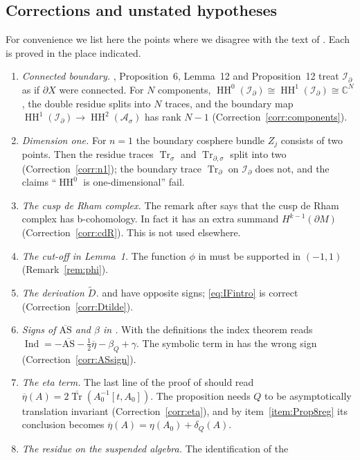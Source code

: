 \documentclass[11pt,oneside,reqno]{article}
\DeclareMathOperator{\HH}{HH}
\DeclareMathOperator{\Tr}{Tr}
\DeclareMathOperator{\Ind}{Ind}
\newcommand{\C}{\mathbb C}
\newcommand{\Id}{\mathcal I_\partial}
\newcommand{\As}{\mathcal A_\sigma}
\newcommand{\bTr}{\overline{\Tr}}
\newcommand{\bAS}{\overline{\mathrm{AS}}}
\newcommand{\etab}{\overline\eta}
\theoremstyle{plain}
\theoremstyle{definition}
\theoremstyle{remark}
\begin{document}
\subsection{Corrections and unstated hypotheses}\label{subsec:errata}
For convenience we list here the points where we disagree with the text of
\cite{MN}. Each is proved in the place indicated.
\begin{enumerate}
\item \emph{Connected boundary.} \cite[(16)]{MN}, Proposition~6,
Lemma~12 and Proposition~12 treat \(\Id\) as if \(\partial X\) were connected.
For \(N\) components, \(\HH^0(\Id)\cong\HH^1(\Id)\cong\C^N\), the
double residue splits into \(N\) traces, and the boundary map
\(\HH^1(\Id)\to\HH^2(\As)\) has rank \(N-1\)
(Correction~\ref{corr:components}).
\item \emph{Dimension one.} For \(n=1\) the boundary cosphere bundle
\(Z_j\) consists of two points. Then the residue traces \(\Tr_\sigma\)
and \(\Tr_{\partial,\sigma}\) split into two (Correction~\ref{corr:n1});
the boundary trace \(\Tr_\partial\) on \(\Id\) does not, and the claims ``\(\HH^0\) is
one-dimensional'' fail.
\item \emph{The cusp de Rham complex.} The remark after \cite[(33)]{MN}
says that the cusp de Rham complex has b-cohomology. In fact it has an
extra summand \(H^{k-1}(\partial M)\) (Correction~\ref{corr:cdR}). This is
not used elsewhere.
\item \emph{The cut-off in Lemma~1.} The function \(\phi\) in \cite[(26)]{MN}
must be supported in \((-1,1)\) (Remark~\ref{rem:phi}).
\item \emph{The derivation \(\widetilde D\).} \cite[(21)]{MN} and
\cite[(83)]{MN} have opposite signs; \eqref{eq:IFintro} is correct
(Correction~\ref{corr:Dtilde}).
\item \emph{Signs of \(\bAS\) and \(\beta\) in \cite[(93)]{MN}.} With the
definitions \cite[(90), (91)]{MN} the index theorem reads
\(\Ind=-\bAS-\frac12\etab-\beta_Q+\gamma\). The symbolic term in
\cite[(23), (100)]{MN} has the wrong sign (Correction~\ref{corr:ASsign}).
\item \emph{The eta term.} The last line of the proof of
\cite[Prop.~17]{MN} should read \(\etab(A)=2\bTr(A_0^{-1}[t,A_0])\).
The proposition needs \(Q\) to be asymptotically translation invariant
(Correction~\ref{corr:eta}), and by item~\ref{item:Prop8reg} its
conclusion becomes \(\etab(A)=\eta(A_0)+\delta_Q(A)\).
\item \emph{The residue on the suspended algebra.} The identification of the

\end{enumerate}
\end{document}

